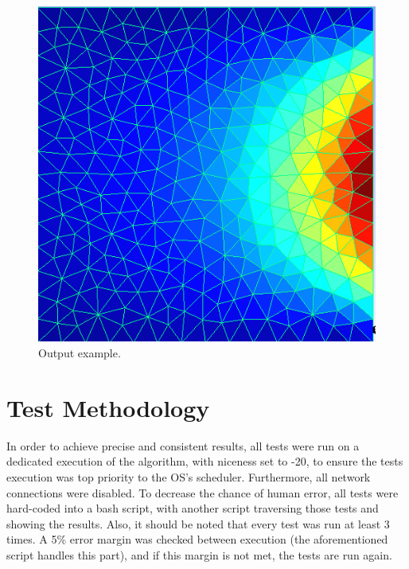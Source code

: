 \documentclass[a4paper,10pt,openright,openbib,twocolumn]{article}
\begin{document}
\begin{figure}[!htb]
    \centering
    \begin{minipage}[t]{\columnwidth}
        \includegraphics[width=\textwidth]{../images/mesh_output.png}
        \caption{Output example.\label{fig:parallel}}
    \end{minipage}
\end{figure}

\section{Test Methodology}
\label{testmet}

In order to achieve precise and consistent results, all tests were run on a dedicated execution of the algorithm, with niceness set to -20, to ensure the tests execution was top priority to the OS's scheduler. Furthermore, all network connections were disabled. To decrease the chance of human error, all tests were hard-coded into a bash script, with another script traversing those tests and showing the results. Also, it should be noted that every test was run at least 3 times. A 5\% error margin was checked between execution (the aforementioned script handles this part), and if this margin is not met, the tests are run again. \\
\end{document}
